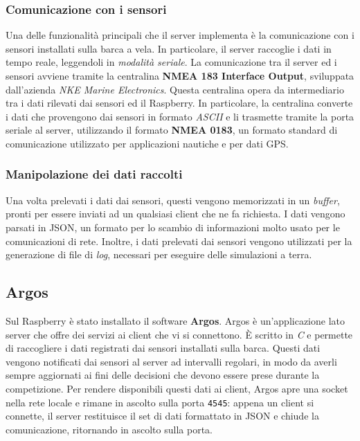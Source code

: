 \subsubsection{Comunicazione con i sensori}
Una delle funzionalità principali che il server implementa è la comunicazione con i sensori installati sulla barca a vela. In particolare, il server raccoglie i dati in tempo reale, leggendoli in \textit{modalità seriale}. La comunicazione tra il server ed i sensori avviene tramite la centralina \textbf{NMEA 183 Interface Output}, sviluppata dall’azienda \textit{NKE Marine Electronics}. Questa centralina opera da intermediario tra i dati rilevati dai sensori ed il Raspberry. In particolare, la centralina converte i dati che provengono dai sensori in formato \textit{ASCII} e li trasmette tramite la porta seriale al server, utilizzando il formato \textbf{NMEA 0183}, un formato standard di comunicazione utilizzato per applicazioni nautiche e per dati GPS.

\newpage

\subsubsection{Manipolazione dei dati raccolti}
Una volta prelevati i dati dai sensori, questi vengono memorizzati in un \textit{buffer}, pronti per essere inviati ad un qualsiasi client che ne fa richiesta. I dati vengono parsati in JSON, un formato per lo scambio di informazioni molto usato per le comunicazioni di rete. Inoltre, i dati prelevati dai sensori vengono utilizzati per la generazione di file di \textit{log}, necessari per eseguire delle simulazioni a terra.

\subsection{Argos}
Sul Raspberry è stato installato il software \textbf{Argos}. Argos è un'applicazione lato server che offre dei servizi ai client che vi si connettono. È scritto in \textit{C} e permette di raccogliere i dati registrati dai sensori installati sulla barca. Questi dati vengono notificati dai sensori al server ad intervalli regolari, in modo da averli sempre aggiornati ai fini delle decisioni che devono essere prese durante la competizione. Per rendere disponibili questi dati ai client, Argos apre una socket nella rete locale e rimane in ascolto sulla porta \verb|4545|: appena un client si connette, il server restituisce il set di dati formattato in JSON e chiude la comunicazione, ritornando in ascolto sulla porta.

